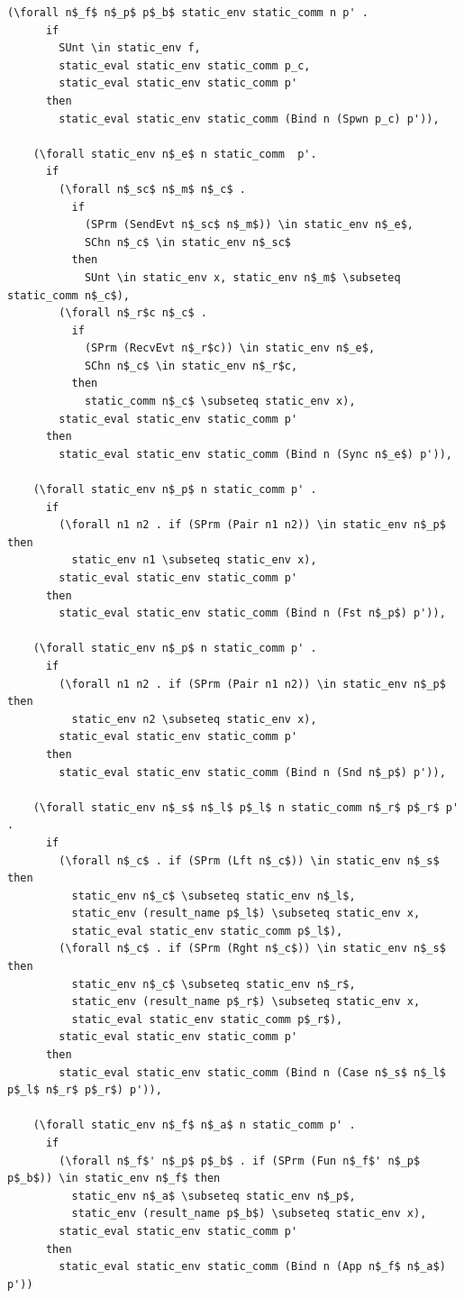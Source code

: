 \documentclass[10pt]{article}
\begin{document}
\begin{lstlisting}[language=logic, mathescape]
    (\forall n$_f$ n$_p$ p$_b$ static_env static_comm n p' .
      if
        SUnt \in static_env f, 
        static_eval static_env static_comm p_c, 
        static_eval static_env static_comm p'
      then
        static_eval static_env static_comm (Bind n (Spwn p_c) p')),

    (\forall static_env n$_e$ n static_comm  p'.
      if
        (\forall n$_sc$ n$_m$ n$_c$ . 
          if
            (SPrm (SendEvt n$_sc$ n$_m$)) \in static_env n$_e$, 
            SChn n$_c$ \in static_env n$_sc$ 
          then
            SUnt \in static_env x, static_env n$_m$ \subseteq static_comm n$_c$),
        (\forall n$_r$c n$_c$ . 
          if
            (SPrm (RecvEvt n$_r$c)) \in static_env n$_e$,
            SChn n$_c$ \in static_env n$_r$c, 
          then
            static_comm n$_c$ \subseteq static_env x),
        static_eval static_env static_comm p'
      then
        static_eval static_env static_comm (Bind n (Sync n$_e$) p')),

    (\forall static_env n$_p$ n static_comm p' . 
      if
        (\forall n1 n2 . if (SPrm (Pair n1 n2)) \in static_env n$_p$ then
          static_env n1 \subseteq static_env x),
        static_eval static_env static_comm p'
      then
        static_eval static_env static_comm (Bind n (Fst n$_p$) p')),

    (\forall static_env n$_p$ n static_comm p' . 
      if
        (\forall n1 n2 . if (SPrm (Pair n1 n2)) \in static_env n$_p$ then
          static_env n2 \subseteq static_env x),
        static_eval static_env static_comm p'
      then
        static_eval static_env static_comm (Bind n (Snd n$_p$) p')),

    (\forall static_env n$_s$ n$_l$ p$_l$ n static_comm n$_r$ p$_r$ p' . 
      if
        (\forall n$_c$ . if (SPrm (Lft n$_c$)) \in static_env n$_s$ then 
          static_env n$_c$ \subseteq static_env n$_l$,
          static_env (result_name p$_l$) \subseteq static_env x,
          static_eval static_env static_comm p$_l$),
        (\forall n$_c$ . if (SPrm (Rght n$_c$)) \in static_env n$_s$ then 
          static_env n$_c$ \subseteq static_env n$_r$, 
          static_env (result_name p$_r$) \subseteq static_env x, 
          static_eval static_env static_comm p$_r$),
        static_eval static_env static_comm p'
      then
        static_eval static_env static_comm (Bind n (Case n$_s$ n$_l$ p$_l$ n$_r$ p$_r$) p')),

    (\forall static_env n$_f$ n$_a$ n static_comm p' . 
      if
        (\forall n$_f$' n$_p$ p$_b$ . if (SPrm (Fun n$_f$' n$_p$ p$_b$)) \in static_env n$_f$ then 
          static_env n$_a$ \subseteq static_env n$_p$, 
          static_env (result_name p$_b$) \subseteq static_env x),
        static_eval static_env static_comm p'
      then
        static_eval static_env static_comm (Bind n (App n$_f$ n$_a$) p'))
  \end{lstlisting}
\end{document}
